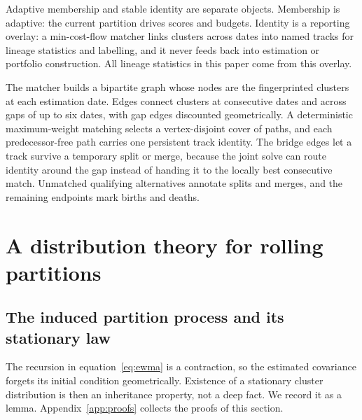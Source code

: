 \documentclass{rQUF2e}
\theoremstyle{plain}
\theoremstyle{remark}
\begin{document}
Adaptive membership and stable identity are separate objects. Membership is
adaptive: the current partition drives scores and budgets. Identity is a
reporting overlay: a min-cost-flow matcher links clusters across dates into
named tracks for lineage statistics and labelling, and it never feeds back into
estimation or portfolio construction. All lineage statistics in this paper come
from this overlay.

The matcher builds a bipartite graph whose nodes are the fingerprinted
clusters at each estimation date. Edges connect clusters at consecutive dates
and across gaps of up to six dates, with gap edges discounted geometrically. A
deterministic maximum-weight matching selects a vertex-disjoint cover of
paths, and each predecessor-free path carries one persistent track identity.
The bridge edges let a track survive a temporary split or merge, because the
joint solve can route identity around the gap instead of handing it to the
locally best consecutive match. Unmatched qualifying alternatives annotate
splits and merges, and the remaining endpoints mark births and deaths.

\section{A distribution theory for rolling partitions}
\label{sec:theory}


\subsection{The induced partition process and its stationary law}

The recursion in equation~\eqref{eq:ewma} is a contraction, so the estimated
covariance forgets its initial condition geometrically. Existence of a
stationary cluster distribution is then an inheritance property, not a deep
fact. We record it as a lemma. Appendix~\ref{app:proofs} collects the proofs
of this section.
\end{document}
